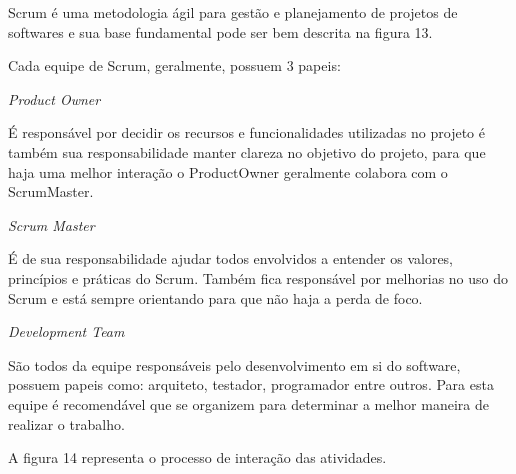 Scrum é uma metodologia ágil para gestão e planejamento de projetos de softwares e sua base fundamental pode ser bem descrita na figura 13.

	\begin{figure}[h!]
		\centering
	\end{figure}

Cada equipe de Scrum, geralmente, possuem 3 papeis:
\begin{alineascomponto}
	\item \textit{Product Owner}
	
É responsável por decidir os recursos e funcionalidades utilizadas no projeto é também sua responsabilidade manter clareza no objetivo do projeto, para que haja uma melhor interação o ProductOwner geralmente colabora com o ScrumMaster.

	\item \textit{Scrum Master}
	
É de sua responsabilidade ajudar todos envolvidos a entender os valores, princípios e práticas do Scrum. Também fica responsável por melhorias no uso do Scrum e está sempre orientando para que não haja a perda de foco. 

	\item \textit{Development Team}
	
São todos da equipe responsáveis pelo desenvolvimento em si do software, possuem papeis como: arquiteto, testador, programador entre outros. Para esta equipe é recomendável que se organizem para determinar a melhor maneira de realizar o trabalho.

	\end{alineascomponto}
	
		A figura 14 representa o processo de interação das atividades.

